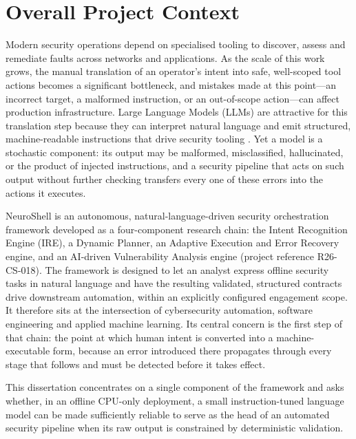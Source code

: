\section{Overall Project Context}\label{sec:overall-project-context}

Modern security operations depend on specialised tooling to discover, assess and
remediate faults across networks and applications. As the scale of this work
grows, the manual translation of an operator's intent into safe, well-scoped tool
actions becomes a significant bottleneck, and mistakes made at this point---an
incorrect target, a malformed instruction, or an out-of-scope action---can affect
production infrastructure. Large Language Models (LLMs) are attractive for this
translation step because they can interpret natural language and emit structured,
machine-readable instructions that drive security tooling
\parencite{deng2024pentestgpt}. Yet a model is a stochastic component: its output
may be malformed, misclassified, hallucinated, or the product of injected
instructions, and a security pipeline that acts on such output without further
checking transfers every one of these errors into the actions it executes.

NeuroShell is an autonomous, natural-language-driven security orchestration
framework developed as a four-component research chain: the Intent Recognition
Engine (IRE), a Dynamic Planner, an Adaptive Execution and Error Recovery engine,
and an AI-driven Vulnerability Analysis engine (project reference R26-CS-018).
The framework is designed to let an analyst express offline security tasks in
natural language and have the resulting validated, structured contracts drive
downstream automation, within an explicitly configured engagement scope. It
therefore sits at the intersection of cybersecurity automation, software
engineering and applied machine learning. Its central concern is the first step
of that chain: the point at which human intent is converted into a
machine-executable form, because an error introduced there propagates through
every stage that follows and must be detected before it takes effect.

This dissertation concentrates on a single component of the framework and asks
whether, in an offline CPU-only deployment, a small instruction-tuned language
model can be made sufficiently reliable to serve as the head of an automated
security pipeline when its raw output is constrained by deterministic
validation.